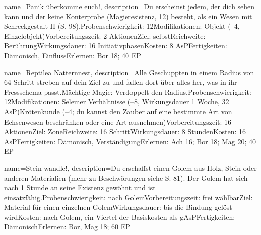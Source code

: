 {
    name={Panik überkomme euch!},
    description={Du erscheinst jedem, der dich sehen kann und der keine Konterprobe (Magieresistenz, 12) besteht, als ein Wesen mit Schreckgestalt II (S. 98).\newline Probenschwierigkeit: 12\newline Modifikationen: Objekt (–4, Einzelobjekt)\newline Vorbereitungszeit: 2 Aktionen\newline Ziel: selbst\newline Reichweite: Berührung\newline Wirkungsdauer: 16 Initiativphasen\newline Kosten: 8 AsP\newline Fertigkeiten: Dämonisch, Einfluss\newline Erlernen: Bor 18; 40 EP}
}


{
    name={Reptilea Natternnest},
    description={Alle Geschuppten in einem Radius von 64 Schritt streben auf dein Ziel zu und fallen dort über alles her, was in ihr Fressschema passt.\newline Mächtige Magie: Verdoppelt den Radius.\newline Probenschwierigkeit: 12\newline Modifikationen: Selemer Verhältnisse (–8, Wirkungsdauer 1 Woche, 32 AsP)\newline Krötenkunde (–4; du kannst den Zauber auf eine bestimmte Art von Echsenwesen beschränken oder eine Art ausnehmen)\newline Vorbereitungszeit: 16 Aktionen\newline Ziel: Zone\newline Reichweite: 16 Schritt\newline Wirkungsdauer: 8 Stunden\newline Kosten: 16 AsP\newline Fertigkeiten: Dämonisch, Verständigung\newline Erlernen: Ach 16; Bor 18; Mag 20; 40 EP}
}


{
    name={Stein wandle!},
    description={Du erschaffst einen Golem aus Holz, Stein oder anderen Materialien (mehr zu Beschwörungen siehe S. 81). Der Golem hat sich nach 1 Stunde an seine Existenz gewöhnt und ist einsatzfähig.\newline Probenschwierigkeit: nach Golem\newline Vorbereitungszeit: frei wählbar\newline Ziel: Material für einen einzelnen Golem\newline Wirkungsdauer: bis die Bindung gelöst wird\newline Kosten: nach Golem, ein Viertel der Basiskosten als gAsP\newline Fertigkeiten: Dämonisch\newline Erlernen: Bor, Mag 18; 60 EP}
}


